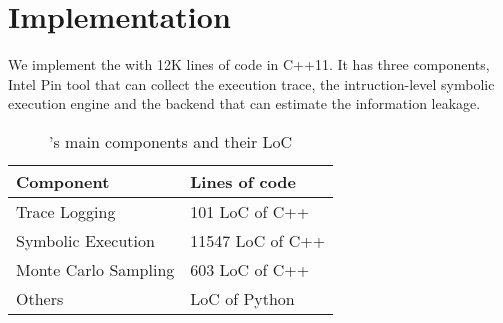 \section{Implementation}
We implement the \tool{} with 12K lines of code in C++11. It has three components, Intel
Pin tool that can collect the execution trace, the intruction-level symbolic execution
engine and the backend that can estimate the information leakage. 

\begin{table}[h]
    \centering
    \begin{tabular}{ll}
    \hline
    Component                            & Lines of code    \\ \hline
    Trace Logging                        & 101 LoC of C++   \\ 
    Symbolic Execution & 11547 LoC of C++ \\ 
    Monte Carlo Sampling                 & 603 LoC of C++   \\ 
    Others                               & LoC of Python    \\ \hline
    \end{tabular}
    \caption{\tool{}'s main components and their LoC}
\end{table}